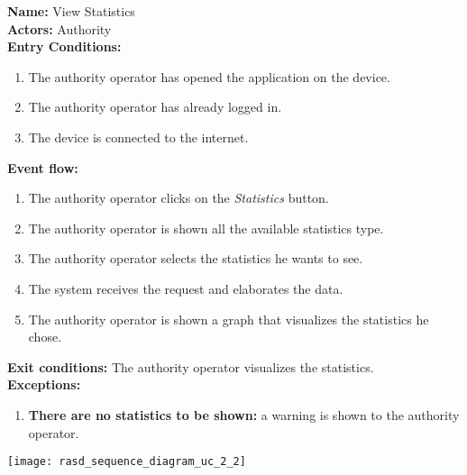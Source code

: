 \begin{usecase}{2.2}
    \textbf{Name: } View Statistics \\
    \textbf{Actors: } Authority \\
    \textbf{Entry Conditions: }
    \begin{enumerate}
        \item The authority operator has opened the application on the device.
        \item The authority operator has already logged in.
        \item The device is connected to the internet.
    \end{enumerate}
    \textbf{Event flow:}
    \begin{enumerate}
        \item The authority operator clicks on the \emph{Statistics} button.
        \item The authority operator is shown all the available statistics type.
        \item The authority operator selects the statistics he wants to see.
        \item The system receives the request and elaborates the data.
        \item The authority operator is shown a graph that visualizes the
        statistics he chose.
    \end{enumerate}
    \textbf{Exit conditions:} The authority operator visualizes the statistics.
    \\
    \textbf{Exceptions:}
    \begin{enumerate}
        \item \textbf{There are no statistics to be shown:} a warning is shown
        to the authority operator.
    \end{enumerate}
    \tcblower
    \centering
    \texttt{[image: rasd\_sequence\_diagram\_uc\_2\_2]}
\end{usecase}